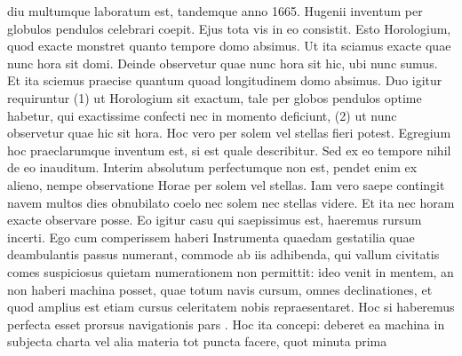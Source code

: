                 \newpage
                \pstart 
                \normalsize
            \centering [46 r\textsuperscript{o}] \pend \vspace{1.0ex} \pstart {}\protect{} diu multumque laboratum est, tandemque anno 1665. Hugenii\protect{} inventum per globulos pendulos celebrari coepit. Ejus tota vis in eo consistit. Esto Horologium\protect{}, quod exacte monstret quanto tempore domo absimus. Ut ita sciamus exacte quae nunc hora sit domi. Deinde observetur quae nunc hora sit hic, ubi nunc sumus. Et ita sciemus praecise quantum quoad longitudinem\protect{} domo absimus. Duo igitur requiruntur (1) ut Horologium\protect{} sit exactum, tale per globos pendulos\protect{} optime habetur, qui exactissime confecti nec in momento deficiunt, (2) ut nunc observetur quae hic sit hora. Hoc vero per solem\protect{} vel stellas\protect{} fieri potest. Egregium hoc praeclarumque inventum est, si est quale describitur. Sed ex eo tempore nihil de eo inauditum. Interim absolutum perfectumque non est, pendet enim ex alieno, nempe observatione Horae per solem\protect{} vel stellas\protect{}. Iam vero saepe contingit navem\protect{} multos dies obnubilato coelo nec solem\protect{} nec stellas\protect{} videre. Et ita nec horam exacte observare posse. Eo igitur casu qui saepissimus est, haeremus rursum incerti. Ego cum comperissem haberi Instrumenta quaedam gestatilia quae deambulantis passus numerant, commode ab iis adhibenda, qui vallum civitatis  comes suspiciosus quietam numerationem non permittit: ideo venit in mentem, an non haberi machina posset, quae totum navis\protect{} cursum, omnes declinationes\protect{}, et quod amplius est etiam cursus celeritatem\protect{} nobis repraesentaret. Hoc si haberemus perfecta esset prorsus navigationis pars . Hoc ita concepi: deberet ea machina in subjecta charta vel alia materia tot puncta facere, quot minuta prima  
